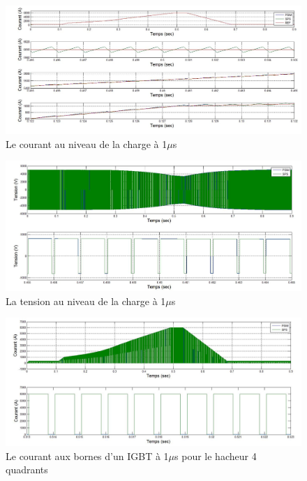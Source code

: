 \begin{figure}[htb]
\centering
\includegraphics[scale=0.5]{fig/Hach_AFE/1u/hach_cou_ch.jpg}
\caption{Le courant au niveau de la charge à 1$\mu$s}
\label{AF_HA_CHA1}
\end{figure}



\begin{figure}[htb]
\centering
\includegraphics[scale=0.5]{fig/Hach_AFE/1u/hach_ten_ch.jpg}
\caption{La tension au niveau de la charge à 1$\mu$s}
\label{AF_HA_CHV1}
\end{figure}

\begin{figure}[htb]
\centering
\includegraphics[scale=0.5]{fig/Hach_AFE/1u/IGBT_cou_hach.jpg}
\caption{Le courant aux bornes d'un IGBT à 1$\mu$s pour le hacheur 4 quadrants}
\label{AF_HA_HAA1}
\end{figure}

